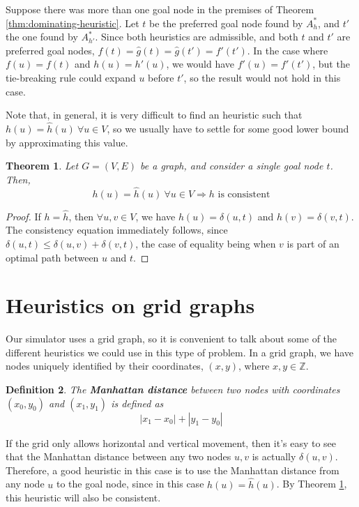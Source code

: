 \documentclass[12pt]{report}
\newtheorem{theorem}{Theorem}[chapter]
\newtheorem{definition}[theorem]{Definition}
\begin{document}
Suppose there was more than one goal node in the premises of Theorem \ref{thm:dominating-heuristic}. Let $t$ be the preferred goal node found by $A^*_h$, and $t'$ the one found by $A^*_{h'}$. Since both heuristics are admissible, and both $t$ and $t'$ are preferred goal nodes, $f(t) = \hat{g}(t) = \hat{g}(t') = f'(t')$. In the case where $f(u) = f(t)$ and $h(u) = h'(u)$, we would have $f'(u) = f'(t')$, but the tie-breaking rule could expand $u$ before $t'$, so the result would not hold in this case.

Note that, in general, it is very difficult to find an heuristic such that $h(u) = \hat{h}(u) \  \forall u \in V$, so we usually have to settle for some good lower bound by approximating this value.

\begin{theorem}
\label{thm:exact-heuristics-consistency}
Let $G = (V, E)$ be a graph, and consider a single goal node $t$. Then,
\[ h(u) = \hat{h}(u) \  \forall u \in V \Rightarrow h \text{ is consistent} \]
\end{theorem}
\begin{proof}
If $h = \hat{h}$, then $\forall u, v \in V$, we have $h(u) = \delta(u, t)$ and $h(v) = \delta(v, t)$.
The consistency equation immediately follows, since $\delta(u, t) \leq \delta(u, v) + \delta(v, t)$, the case of equality being when $v$ is part of an optimal path between $u$ and $t$.
\end{proof}

\section{Heuristics on grid graphs}
\label{section:heuristics-grid}
Our simulator uses a grid graph, so it is convenient to talk about some of the different heuristics we could use in this type of problem. In a grid graph, we have nodes uniquely identified by their coordinates, $(x, y)$, where $x,y \in \mathbb{Z}$.

\begin{definition}
The \textbf{Manhattan distance} between two nodes with coordinates $(x_0, y_0)$ and $(x_1, y_1)$ is defined as
\begin{equation}
|x_1 - x_0| + |y_1 - y_0|
\end{equation}
\end{definition}

If the grid only allows horizontal and vertical movement, then it's easy to see that the Manhattan distance between any two nodes $u, v$ is actually $\delta(u, v)$. Therefore, a good heuristic in this case is to use the Manhattan distance from any node $u$ to the goal node, since in this case $h(u) = \hat{h}(u)$. By Theorem \ref{thm:exact-heuristics-consistency}, this heuristic will also be consistent.
\end{document}
